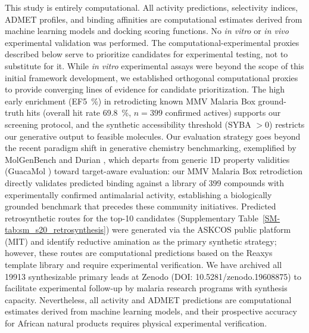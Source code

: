 \documentclass[journal=jcisd8,manuscript=article]{achemso}
\begin{document}
This study is entirely computational. All activity predictions, selectivity indices, ADMET profiles, and binding affinities are computational estimates derived from machine learning models and docking scoring functions. No \textit{in vitro} or \textit{in vivo} experimental validation was performed. The computational-experimental proxies described below serve to prioritize candidates for experimental testing, not to substitute for it. While \textit{in vitro} experimental assays were beyond the scope of this initial framework development, we established orthogonal computational proxies to provide converging lines of evidence for candidate prioritization. The high early enrichment (EF\qty{5}{\percent}) in retrodicting known MMV Malaria Box ground-truth hits (overall hit rate \qty{69.8}{\percent}, $n = \num{399}$ confirmed actives) supports our screening protocol, and the synthetic accessibility threshold (SYBA $> \num{0}$) restricts our generative output to feasible molecules. Our evaluation strategy goes beyond the recent paradigm shift in generative chemistry benchmarking, exemplified by MolGenBench \cite{Cao2025molgenbench} and Durian \cite{Nie2024durian}, which departs from generic 1D property validities (GuacaMol \cite{Brown2019}) toward target-aware evaluation: our MMV Malaria Box retrodiction directly validates predicted binding against a library of \num{399} compounds with experimentally confirmed antimalarial activity, establishing a biologically grounded benchmark that precedes these community initiatives. Predicted retrosynthetic routes for the top-10 candidates (Supplementary Table~\ref{SM-tab:sm_s20_retrosynthesis}) were generated via the ASKCOS public platform (MIT) and identify reductive amination as the primary synthetic strategy; however, these routes are computational predictions based on the Reaxys template library and require experimental verification. We have archived all \num{19913} synthesizable primary leads at Zenodo (DOI: 10.5281/zenodo.19608875) to facilitate experimental follow-up by malaria research programs with synthesis capacity. Nevertheless, all activity and ADMET predictions are computational estimates derived from machine learning models, and their prospective accuracy for African natural products requires physical experimental verification.
\end{document}
